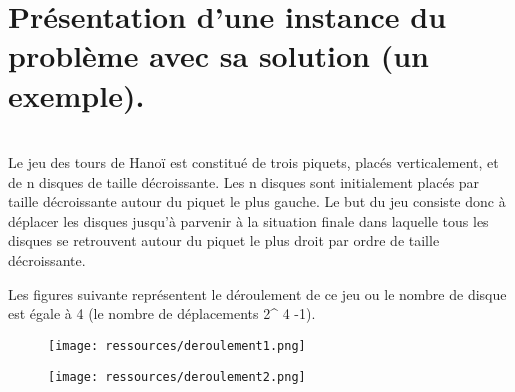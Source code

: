 \section{Présentation d'une instance du problème avec sa solution (un exemple).}
\\
Le jeu des tours de Hanoï est constitué de trois piquets, placés verticalement, et de n disques de taille décroissante. Les n disques sont initialement placés par taille décroissante autour du piquet le plus gauche. Le but du jeu  consiste donc à déplacer les disques jusqu’à parvenir à la situation finale dans laquelle tous les disques se retrouvent autour du piquet le plus droit par ordre de taille décroissante. 
\par
Les figures suivante représentent le déroulement de ce jeu ou le nombre de disque est égale à 4 (le nombre de déplacements 2^ 4 -1).
\par
\begin{figure}[H]
    \centering
        \texttt{[image: ressources/deroulement1.png]}
        
    \label{fig:derouelement1}
\end{figure}
\begin{figure}[H]
    \centering
        \texttt{[image: ressources/deroulement2.png]}
        
    \label{fig:derouelement2}
\end{figure}

